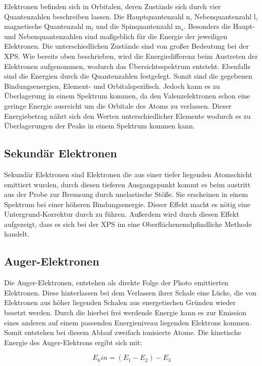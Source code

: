 \documentclass{article}
\begin{document}
Elektronen befinden sich in Orbitalen, deren Zustände sich durch vier
Quantenzahlen beschreiben lassen. Die Hauptquantenzahl n, Nebenquantenzahl l,
magnetische Quantenzahl m$_l$ und die Spinquantenzahl m$_s$. Besonders die
Haupt- und Nebenquantenzahlen sind maßgeblich für die Energie der jeweiligen
Elektronen. Die unterschiedlichen Zustände sind von großer Bedeutung bei der
XPS. Wie bereits oben beschrieben, wird die Energiedifferenz beim Austreten der
Elektronen aufgenommen, wodurch das Übersichtsspektrum entsteht. Ebenfalls sind
die Energien durch die Quantenzahlen festgelegt. Somit sind die gegebenen
Bindungsenergien, Element- und Orbitalspezifisch. Jedoch kann es zu
Überlagerung in einem Spektrum kommen, da den Valenzelektronen schon eine
geringe Energie ausreicht um die Orbitale des Atoms zu verlassen. Dieser
Energiebetrag nährt sich den Werten unterschiedlicher Elemente wodurch es zu
Überlagerungen der Peaks in einem Spektrum kommen kann.



\subsection{Sekundär Elektronen}

Sekundär Elektronen sind Elektronen die aus einer tiefer liegenden Atomschicht
emittiert wurden, durch diesen tieferen Ausgangspunkt kommt es beim austritt
aus der Probe zur Bremsung durch unelastische Stöße. Sie erscheinen in einem
Spektrum bei einer höheren Bindungsenergie. Dieser Effekt macht es nötig eine
Untergrund-Korrektur durch zu führen. Außerdem wird durch diesen Effekt
aufgezeigt, dass es sich bei der XPS im eine Oberflächenemdpfindliche Methode
handelt. 

\subsection{Auger-Elektronen}

Die Auger-Elektronen, entstehen als direkte Folge der Photo emittierten
Elektronen. Diese hinterlassen bei dem Verlassen ihrer Schale eine Lücke, die
von Elektronen aus höher liegenden Schalen aus energetischen Gründen wieder
besetzt werden. Durch die hierbei frei werdende Energie kann es zur Emission
eines anderen auf einem passenden Energieniveau liegenden Elektrons kommen.
Somit entstehen bei diesem Ablauf zweifach ionisierte Atome. Die kinetische
Energie des Auger-Elektrons ergibt sich mit:

\begin{equation} E{_kin} = (E_1-E_2)-E_3 \end{equation}
\end{document}
